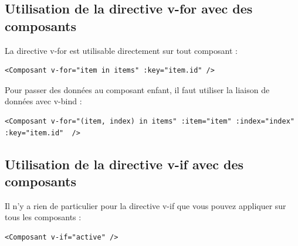 \subsection{Utilisation de la directive {\color{monOrange}v-for} avec des composants}
La directive {\color{monOrange}v-for} est utilisable directement sur tout composant :
\begin{verbatim}
<Composant v-for="item in items" :key="item.id" />
\end{verbatim}
Pour passer des données au composant enfant, il faut utiliser la liaison de données avec {\color{monOrange}v-bind} :
\begin{verbatim}
<Composant v-for="(item, index) in items" :item="item" :index="index" :key="item.id"  />
\end{verbatim}

\subsection{Utilisation de la directive {\color{monOrange}v-if} avec des composants}
Il n'y a rien de particulier pour la directive {\color{monOrange}v-if} que vous pouvez appliquer sur tous les composants :
\begin{verbatim}
<Composant v-if="active" />
\end{verbatim}

